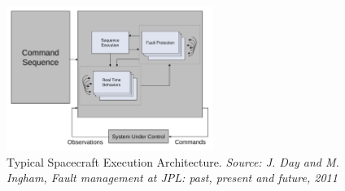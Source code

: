 \begin{figure}[htb]
	\begin{center}
	\includegraphics[width=0.6\textwidth]{img/spacecraft_execution_architecture.pdf}
	\caption{Typical Spacecraft Execution Architecture. \small{\textit{Source: J.
	Day and M. Ingham, Fault management at JPL: past, present and future, 2011}}}
	\label{fig:spacecraft_execution_architecture}
	\end{center}
\end{figure}